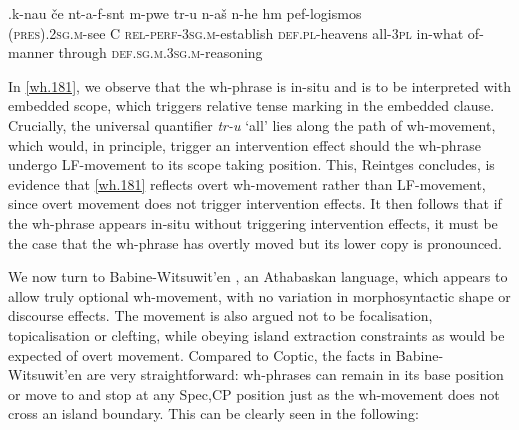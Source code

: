 \documentclass{glossa}
\begin{document}
\exg.\label{wh.181}k-nau \v{c}e {\textschwa}nt-a-f-s{\textschwa}nt {\textschwa}m-p{\textepsilon}we t{\textepsilon}r-u {\textschwa}n-a\v{s} {\textschwa}n-he h{\textschwa}m pef-logismos\\
   \textsc{(pres).2sg.m}-see C \textsc{rel-perf-3sg.m}-establish \textsc{def.pl}-heavens all-\textsc{3pl} in-what of-manner through \textsc{def.sg.m.3sg.m}-reasoning\\

In \ref{wh.181}, we observe that the wh-phrase is in-situ and is to be interpreted with embedded scope, which triggers relative tense marking in the embedded clause. Crucially, the universal quantifier \textit{t\textepsilon r-u} `all' lies along the path of wh-movement, which would, in principle, trigger an intervention effect should the wh-phrase undergo LF-movement to its scope taking position. This, Reintges concludes, is evidence that \ref{wh.181} reflects overt wh-movement rather than LF-movement, since overt movement does not trigger intervention effects. It then follows that if the wh-phrase appears in-situ without triggering intervention effects, it must be the case that the wh-phrase has overtly moved but its lower copy is pronounced.
%
%

We now turn to Babine-Witsuwit'en \citep{denham:1997,denham:2000}, an Athabaskan language, which appears to allow truly optional wh-movement, with no variation in morphosyntactic shape or discourse effects. The movement is also argued not to be focalisation, topicalisation or clefting, while obeying island extraction constraints as would be expected of overt movement. Compared to Coptic, the facts in Babine-Witsuwit'en are very straightforward: wh-phrases can remain in its base position or move to and stop at any Spec,CP position just as the wh-movement does not cross an island boundary. This can be clearly seen in the following:
\end{document}
